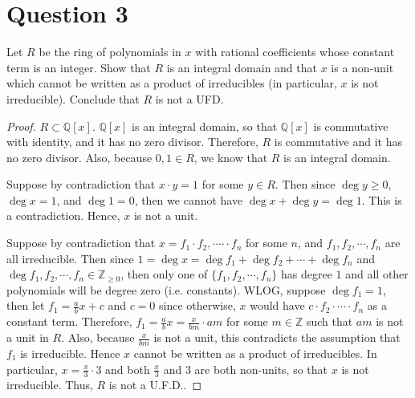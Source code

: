\section{Question 3}

\begin{question}
    Let $R$ be the ring of polynomials in $x$ with rational coefficients whose constant term is an integer. Show that $R$ is an integral domain and that $x$ is a non-unit which cannot be written as a product of irreducibles (in particular, $x$ is not irreducible). Conclude that $R$ is not a UFD.
\end{question}

\begin{answer}
    \begin{proof}
        $R \subset \mathbb{Q}[x]$. $\mathbb{Q}[x]$ is an integral domain, so that $\mathbb{Q}[x]$ is commutative with identity, and it has no zero divisor. Therefore, $R$ is commutative and it has no zero divisor. Also, because $0,1 \in R$, we know that $R$ is an integral domain.
        
        Suppose by contradiction that $x \cdot y = 1$ for some $y \in R$. Then since $\deg y \geq 0$, $\deg x = 1$, and $\deg 1 = 0$, then we cannot have $\deg x + \deg y = \deg 1$. This is a contradiction. Hence, $x$ is not a unit.
        
        Suppose by contradiction that $x = f_1 \cdot f_2, \cdot \cdots \cdot f_n$ for some $n$, and $f_1,f_2,\cdots,f_n$ are all irreducible. Then since $1 = \deg x = \deg f_1 + \deg f_2 + \cdots + \deg f_n$ and $\deg f_1,f_2,\cdots,f_n \in \mathbb{Z}_{\geq 0}$, then only one of $\{f_1,f_2,\cdots,f_n\}$ has degree $1$ and all other polynomials will be degree zero (i.e. constants). WLOG, suppose $\deg f_1 = 1$, then let $f_1 = \tfrac{a}{b}x + c$ and $c = 0$ since otherwise, $x$ would have $c\cdot f_2\cdot \cdots \cdot f_n$ as a constant term. Therefore, $f_1 = \tfrac{a}{b}x = \tfrac{x}{bm} \cdot am$ for some $m \in \mathbb{Z}$ such that $am$ is not a unit in $R$. Also, because $\tfrac{x}{bm}$ is not a unit, this contradicts the assumption that $f_1$ is irreducible. Hence $x$ cannot be written as a product of irreducibles. In particular, $x = \tfrac{x}{3} \cdot 3$ and both $\tfrac{x}{3}$ and $3$ are both non-units, so that $x$ is not irreducible. Thus, $R$ is not a U.F.D..
    \end{proof}
\end{answer}